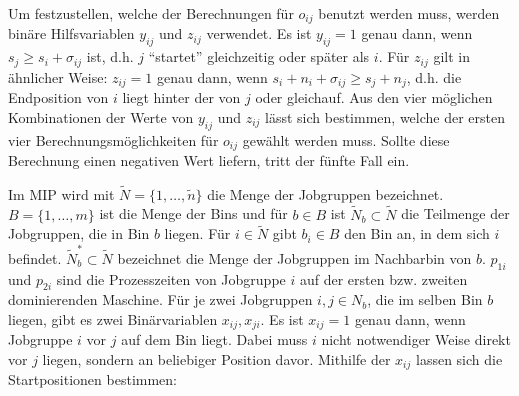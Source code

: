 \documentclass{scrreprt}
\begin{document}
Um festzustellen, welche der Berechnungen für $o_{ij}$ benutzt werden muss, werden binäre Hilfsvariablen $y_{ij}$ und $z_{ij}$ verwendet.
Es ist $y_{ij}=1$ genau dann, wenn $s_j \geq s_i + \sigma_{ij}$ ist, d.h. $j$ "`startet"' gleichzeitig oder später als $i$.
Für $z_{ij}$ gilt in ähnlicher Weise: $z_{ij}=1$ genau dann, wenn $s_i + n_i + \sigma_{ij} \geq s_j + n_j$, 
d.h. die Endposition von $i$ liegt hinter der von $j$ oder gleichauf.
Aus den vier möglichen Kombinationen der Werte von $y_{ij}$ und $z_{ij}$ lässt sich bestimmen, 
welche der ersten vier Berechnungsmöglichkeiten für $o_{ij}$ gewählt werden muss.
Sollte diese Berechnung einen negativen Wert liefern, tritt der fünfte Fall ein.

Im MIP wird mit $\tilde{N}=\{1,\ldots,\tilde{n}\}$ die Menge der Jobgruppen bezeichnet.
$B=\{1,\ldots,m\}$ ist die Menge der Bins und für $b\in B$ ist $\tilde{N}_b\subset \tilde{N}$ die Teilmenge der Jobgruppen, die in Bin $b$ liegen.
Für $i\in\tilde{N}$ gibt $b_i\in B$ den Bin an, in dem sich $i$ befindet.
$\tilde{N}_b^*\subset \tilde{N}$ bezeichnet die Menge der Jobgruppen im Nachbarbin von $b$.
$p_{1i}$ und $p_{2i}$ sind die Prozesszeiten von Jobgruppe $i$ auf der ersten bzw. zweiten dominierenden Maschine.
Für je zwei Jobgruppen $i,j\in N_b$, die im selben Bin $b$ liegen, gibt es
zwei Binärvariablen $x_{ij},x_{ji}$. Es ist $x_{ij}=1$ genau dann, wenn 
Jobgruppe $i$ vor $j$ auf dem Bin liegt. Dabei muss $i$ nicht notwendiger
Weise direkt vor $j$ liegen, sondern an beliebiger Position davor.
Mithilfe der $x_{ij}$ lassen sich die Startpositionen bestimmen:
\end{document}
